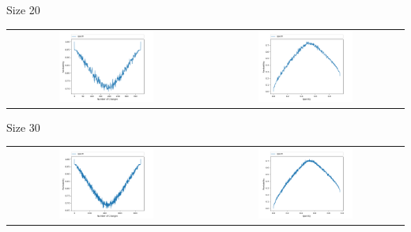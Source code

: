 \documentclass{beamer}
\begin{document}
\begin{frame}{Size 20}
\centering
\begin{tabular}{cc}
\includegraphics[width=0.5\textwidth]{figures/test_rand_pert_20.png}
&
\includegraphics[width=0.5\textwidth]{figures/test_sparse_20.png}
\end{tabular}
\end{frame}

\begin{frame}{Size 30}
\centering
\begin{tabular}{cc}
\includegraphics[width=0.5\textwidth]{figures/test_rand_pert_30.png}
&
\includegraphics[width=0.5\textwidth]{figures/test_sparse_30.png}
\end{tabular}
\end{frame}
\end{document}
